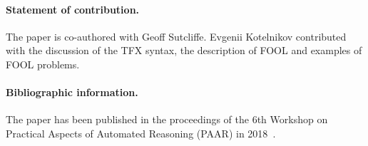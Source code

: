 \paragraph{Statement of contribution.} The paper is co-authored with Geoff Sutcliffe. Evgenii Kotelnikov contributed with the discussion of the TFX syntax, the description of FOOL and examples of FOOL problems.

\paragraph{Bibliographic information.} The paper has been published in the proceedings of the 6th Workshop on Practical Aspects of Automated Reasoning (PAAR) in 2018~\cite{SutcliffeK18}.
